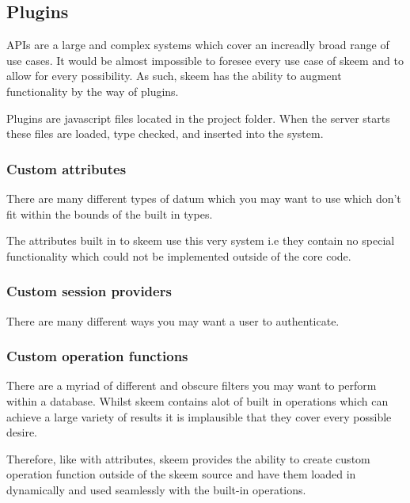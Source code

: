 \documentclass[
  12pt,
]{article}
\begin{document}
\hypertarget{plugins}{%
\subsection{Plugins}\label{plugins}}

APIs are a large and complex systems which cover an increadly broad
range of use cases. It would be almost impossible to foresee every use
case of skeem and to allow for every possibility. As such, skeem has the
ability to augment functionality by the way of plugins.

Plugins are javascript files located in the project folder. When the
server starts these files are loaded, type checked, and inserted into
the system.

\hypertarget{custom-attributes}{%
\subsubsection{Custom attributes}\label{custom-attributes}}

There are many different types of datum which you may want to use which
don't fit within the bounds of the built in types.

The attributes built in to skeem use this very system i.e they contain
no special functionality which could not be implemented outside of the
core code.

\hypertarget{custom-session-providers}{%
\subsubsection{Custom session
providers}\label{custom-session-providers}}

There are many different ways you may want a user to authenticate.

\hypertarget{custom-operation-functions}{%
\subsubsection{Custom operation
functions}\label{custom-operation-functions}}

There are a myriad of different and obscure filters you may want to
perform within a database. Whilst skeem contains alot of built in
operations which can achieve a large variety of results it is
implausible that they cover every possible desire.

Therefore, like with attributes, skeem provides the ability to create
custom operation function outside of the skeem source and have them
loaded in dynamically and used seamlessly with the built-in operations.
\end{document}
